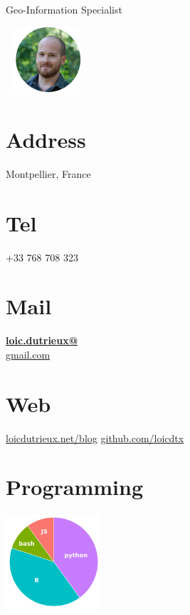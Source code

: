 \documentclass[]{friggeri-cv}
\begin{document}
      {Geo-Information Specialist}
      


\begin{aside}
    ~
    \includegraphics[width=2.5cm]{img/profile_circle_small.png}
    ~
  \section{Address}
    Montpellier,
    France
    ~
  \section{Tel}
    +33 768 708 323
    ~
  \section{Mail}
    \href{mailto:loic.dutrieux@gmail.com}{\textbf{loic.dutrieux@}\\gmail.com}
    ~
  \section{Web}
    \href{http://www.loicdutrieux.net/blog}{loicdutrieux.net/blog}
    \href{https://github.com/loicdtx}{github.com/loicdtx}
    ~
  \section{Programming}
    \includegraphics[width=3.5cm]{img/programming.png}
    ~

\end{aside}
\end{document}
